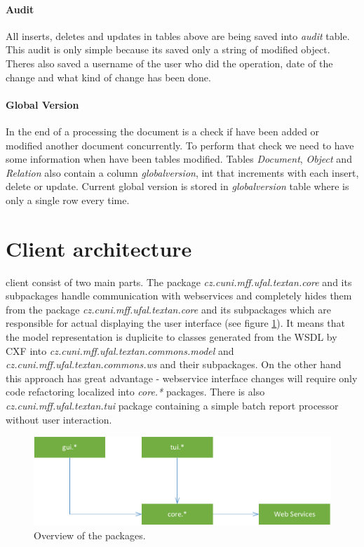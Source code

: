 \paragraph{Audit} All inserts, deletes and updates in tables above are being saved into \emph{audit} table. This audit is only simple because its saved only a string of modified object. Theres also saved a username of the user who did the operation, date of the change and what kind of change has been done.
 
\paragraph{Global Version} In the end of a processing the document is a check if have been added or modified another document concurrently. To perform that check we need to have some information when have been tables modified. Tables \emph{Document}, \emph{Object} and \emph{Relation} also contain a column \emph{globalversion}, int that increments with each insert, delete or update. Current global version is stored in \emph{globalversion} table where is only a single row every time.


\section{Client architecture}



\textan{} client consist of two main parts. The package
\emph{cz.cuni.mff.ufal.textan.core} and its subpackages handle communication
with webservices and completely hides them from the package
\emph{cz.cuni.mff.ufal.textan.core} and its subpackages which are responsible
for actual displaying the user interface (see figure \ref{fig:ClientOverview}).
It means that the model representation is duplicite to classes generated from
the WSDL by CXF into \emph{cz.\-cuni.\-mff.\-ufal.\-textan.\-commons.\-model}
and \emph{cz.\-cuni.\-mff.\-ufal.\-textan.\-commons.\-ws} and their subpackages.
On the other hand this approach has great advantage - webservice interface
changes will require only code refactoring localized into \emph{core.*}
packages. There is also \emph{cz.\-cuni.\-mff.\-ufal.\-textan.\-tui} package
containing a simple batch report processor without user interaction.

\begin{figure}[!htb]
        \centering
        \includegraphics[width=\textwidth]{Images/ClientOverview}
        \caption{Overview of the packages.}
        \label{fig:ClientOverview}
\end{figure}

